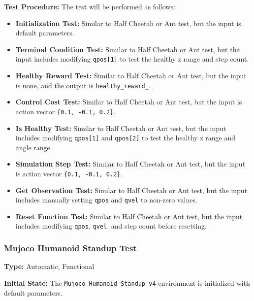 \documentclass[12pt, titlepage]{article}
\begin{document}
\textbf{Test Procedure:} The test will be performed as follows:
\begin{itemize}
    \item \textbf{Initialization Test:} Similar to Half Cheetah or Ant test, but the input is default parameters.
    
    \item \textbf{Terminal Condition Test:} Similar to Half Cheetah or Ant test, but the input includes modifying \texttt{qpos[1]} to test the healthy z range and step count.
    
    \item \textbf{Healthy Reward Test:} Similar to Half Cheetah or Ant test, but the input is none, and the output is \texttt{healthy\_reward\_}.
    
    \item \textbf{Control Cost Test:} Similar to Half Cheetah or Ant test, but the input is action vector \texttt{\{0.1, -0.1, 0.2\}}.
    
    \item \textbf{Is Healthy Test:} Similar to Half Cheetah or Ant test, but the input includes modifying \texttt{qpos[1]} and \texttt{qpos[2]} to test the healthy z range and angle range.
    
    \item \textbf{Simulation Step Test:} Similar to Half Cheetah or Ant test, but the input is action vector \texttt{\{0.1, -0.1, 0.2\}}.
    
    \item \textbf{Get Observation Test:} Similar to Half Cheetah or Ant test, but the input includes manually setting \texttt{qpos} and \texttt{qvel} to non-zero values.
    
    \item \textbf{Reset Function Test:} Similar to Half Cheetah or Ant test, but the input includes modifying \texttt{qpos}, \texttt{qvel}, and step count before resetting.
\end{itemize}

\subsubsection{Mujoco Humanoid Standup Test\\}

\textbf{Type:} Automatic, Functional

\textbf{Initial State:} The \texttt{Mujoco\_Humanoid\_Standup\_v4} environment is initialized with default parameters.
\end{document}
